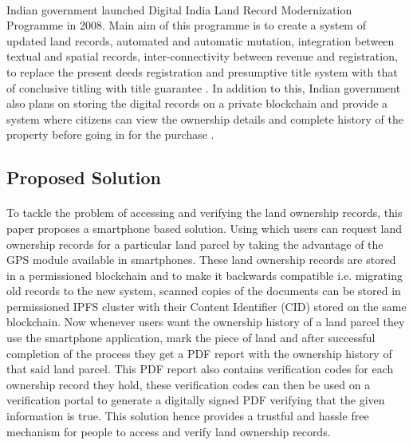 \documentclass{article}
\begin{document}
        \paragraph{}
        Indian government launched Digital India Land Record Modernization Programme in 2008. Main aim of this programme is to create a system of updated land records, automated and automatic mutation, integration between textual and spatial records, inter-connectivity between revenue and registration, to replace the present deeds registration and presumptive title system with that of conclusive titling with title guarantee \cite{dilrmp}. In addition to this, Indian government also plans on storing the digital records on a private blockchain and provide a system where citizens can view the ownership details and complete history of the property before going in for the purchase \cite{blockchaingovin}.  

    \subsection{Proposed Solution}
        \paragraph{}
        To tackle the problem of accessing and verifying the land ownership records, this paper proposes a smartphone based solution. Using which users can request land ownership records for a particular land parcel by taking the advantage of the GPS module available in smartphones. These land ownership records are stored in a permissioned blockchain and to make it backwards compatible i.e. migrating old records to the new system, scanned copies of the documents can be stored in permissioned IPFS cluster with their Content Identifier (CID) stored on the same blockchain. Now whenever users want the ownership history of a land parcel they use the smartphone application, mark the piece of land and after successful completion of the process they get a PDF report with the ownership history of that said land parcel. This PDF report also contains verification codes for each ownership record they hold, these verification codes can then be used on a verification portal to generate a digitally signed PDF verifying that the given information is true. This solution hence provides a trustful and hassle free mechanism for people to access and verify land ownership records.

    \clearpage
    
    
\end{document}
